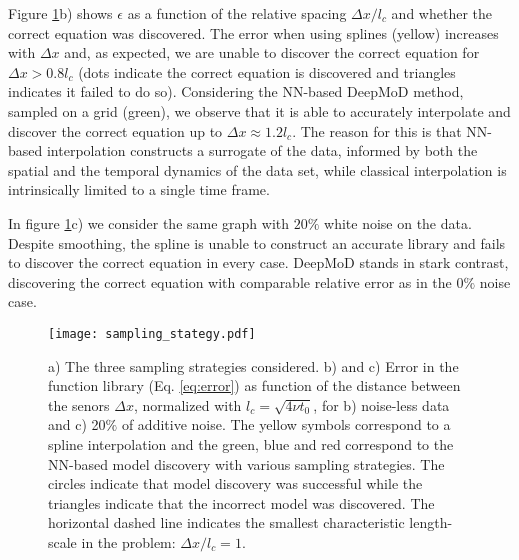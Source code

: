 \documentclass{article} %
\begin{document}
Figure \ref{fig:burgers}b) shows $\epsilon$ as a function of the relative spacing $\Delta x / l_c$ and whether the correct equation was discovered. The error when using splines (yellow) increases with $\Delta x$ and, as expected, we are unable to discover the correct equation for $\Delta x > 0.8 l_c$ (dots indicate the correct equation is discovered and triangles indicates it failed to do so). Considering the NN-based DeepMoD method, sampled on a grid (green), we observe that it is able to accurately interpolate and discover the correct equation up to $\Delta x \approx 1.2 l_c$.  The reason for this is that NN-based interpolation constructs a surrogate of the data, informed by both the spatial and the temporal dynamics of the data set, while classical interpolation is intrinsically limited to a single time frame. 

In figure \ref{fig:burgers}c) we consider the same graph with $20\%$ white noise on the data. Despite smoothing, the spline is unable to construct an accurate library and fails to discover the correct equation in every case. DeepMoD stands in stark contrast, discovering the correct equation with comparable relative error as in the $0\%$ noise case. 

\begin{figure}
    \centering
    \texttt{[image: sampling\_stategy.pdf]}
    \caption{a) The three sampling strategies considered. b) and c) Error in the function library (Eq. \ref{eq:error}) as function of the distance between the senors $\Delta x$, normalized with $l_c = \sqrt{4 \nu t_0}$, for b) noise-less data and c) 20$\%$ of additive noise. The yellow symbols correspond to a spline interpolation and the green, blue and red correspond to the NN-based model discovery with various sampling strategies. The circles indicate that model discovery was successful while the triangles indicate that the incorrect model was discovered. The horizontal dashed line indicates the smallest characteristic length-scale in the problem: $\Delta x / l_c = 1$. }
    \label{fig:burgers}
\end{figure}
\end{document}
